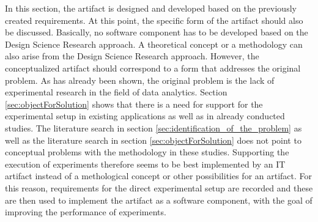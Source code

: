 In this section, the artifact is designed and developed based on the previously created requirements. At this point, the specific form of the artifact should also be discussed. Basically, no software component has to be developed based on the Design Science Research approach. A theoretical concept or a methodology can also arise from the Design Science Research approach. However, the conceptualized artifact should correspond to a form that addresses the original problem. As has already been shown, the original problem is the lack of experimental research in the field of data analytics. Section \ref{sec:objectForSolution} shows that there is a need for support for the experimental setup in existing applications as well as in already conducted studies. The literature search in section \ref{sec:identification_of_the_problem} as well as the literature search in section \ref{sec:objectForSolution} does not point to conceptual problems with the methodology in these studies. Supporting the execution of experiments therefore seems to be best implemented by an IT artifact instead of a methological concept or other possibilities for an artifact. For this reason, requirements for the direct experimental setup are recorded and these are then used to implement the artifact as a software component, with the goal of improving the performance of experiments.

